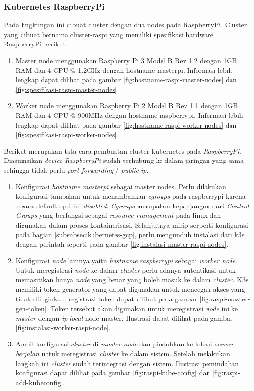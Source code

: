 \subsubsection{Kubernetes RaspberryPi}
Pada lingkungan ini dibuat cluster dengan dua nodes pada RaspberryPi. Cluster yang dibuat bernama cluster-raspi yang memiliki spesifikasi hardware RaspberryPi berikut.

\begin{enumerate}
  \item Master node menggunakan Raspberry Pi 3 Model B Rev 1.2 dengan 1GB RAM dan 4 CPU @ 1.2GHz dengan hostname masterpi. Informasi lebih lengkap dapat dilihat pada gambar \ref{fig:hostname-raspi-master-nodes} dan \ref{fig:spesifikasi-raspi-master-nodes}
  \item Worker node menggunakan Raspberry Pi 2 Model B Rev 1.1 dengan 1GB RAM dan 4 CPU @ 900MHz dengan hostname raspberrypi. Informasi lebih lengkap dapat dilihat pada gambar \ref{fig:hostname-raspi-worker-nodes} dan \ref{fig:spesifikasi-raspi-worker-nodes}
\end{enumerate}

Berikut merupakan tata cara pembuatan cluster kubernetes pada \textit{RaspberryPi}. Diasumsikan \textit{device} \textit{RaspberryPi} sudah terhubung ke dalam jaringan yang sama sehingga tidak perlu \textit{port forwarding} / \textit{public ip}.

\begin{enumerate}
  \item Konfigurasi \textit{hostname masterpi} sebagai master nodes. Perlu dilakukan konfigurasi tambahan untuk menambahkan \textit{cgroups} pada raspberrypi karena secara default opsi ini \textit{disabled}. \textit{Cgroups} merupakan kepanjangan dari \textit{Control Groups} yang berfungsi sebagai \textit{resource management} pada linux dan digunakan dalam proses kontainerisasi. Selanjutnya mirip serperti konfigurasi pada bagian \ref{subsubsec:kubernetes-gcp}, perlu mengunduh instalasi dari k3s dengan perintah seperti pada gambar \ref{fig:instalasi-master-raspi-nodes}.
  \item Konfigurasi \textit{node} lainnya yaitu \textit{hostname raspberrypi} sebagai \textit{worker node}. Untuk meregistrasi \textit{node} ke dalam \textit{cluster} perlu adanya autentikasi untuk memasitikan hanya \textit{node} yang benar yang boleh masuk ke dalam \textit{cluster}. K3s memiliki token generator yang dapat digunakan untuk mencegah akses yang tidak diinginkan, registrasi token dapat dilihat pada gambar \ref{fig:raspi-master-gen-token}. Token tersebut akan digunakan untuk meregistrasi \textit{node} ini ke \textit{master} dengan \textit{ip local} node master. Ilustrasi dapat dilihat pada gambar \ref{fig:instalasi-worker-raspi-node}.
  \item Ambil konfigurasi \textit{cluster} di \textit{master node} dan pindahkan ke lokasi \textit{server berjalan} untuk meregistrasi \textit{cluster} ke dalam sistem. Setelah melakukan langkah ini \textit{cluster} sudah terintegrasi dengan sistem. Ilustrasi pemindahan konfigurasi dapat dilihat pada gambar \ref{fig:raspi-kube-config} dan \ref{fig:raspi-add-kubeconfig}.
\end{enumerate}
